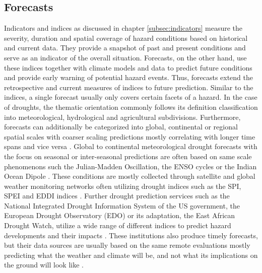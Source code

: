 
\subsection{Forecasts}

Indicators and indices as discussed in chapter \ref{subsec:indicators} measure the severity, duration and spatial coverage of hazard conditions based on historical and current data. They provide a snapshot of past and present conditions and serve as an indicator of the overall situation. Forecasts, on the other hand, use these indices together with climate models and data to predict future conditions and provide early warning of potential hazard events. Thus, forecasts extend the retrospective and current measures of indices to future prediction.\newline
Similar to the indices, a single forecast usually only covers certain facets of a hazard. In the case of droughts, the thematic orientation commonly follows its definition classification into meteorological, hydrological and agricultural subdivisions. Furthermore, forecasts can additionally be categorized into global, continental or regional spatial scales with coarser scaling predictions mostly correlating with longer time spans and vice versa \autocite{baltiReviewDroughtMonitoring2020}. Global to continental meteorological drought forecasts with the focus on seasonal or inter-seasonal predictions are often based on same scale phenomenons such the Julian-Madden Oscillation, the ENSO cycles or the Indian Ocean Dipole \autocite{andersonMaddenJulianOscillationAffects2022,goreUnderstandingInfluenceENSO2020,yuanInfluencesIndianOcean2008}. These conditions are mostly collected through satellite and global weather monitoring networks often utilizing drought indices such as the SPI, SPEI and EDDI indices \autocite{kimIntegratedDroughtMonitoring2021}. Further drought prediction services such as the National Integrated Drought Information System of the US government, the European Drought Observatory (EDO) or its adaptation, the East African Drought Watch, utilize a wide range of different indices to predict hazard developments and their impacts \autocite{europeandroughtobservatoryDroughtIndicators2017,icpacDroughtIndicators2023, nidisOutlooksForecasts2023}. These institutions also produce timely forecasts, but their data sources are usually based on the same remote evaluations mostly predicting what the weather and climate will be, and not what its implications on the ground will look like \autocite{enenkelWhyPredictClimate2020}. 

